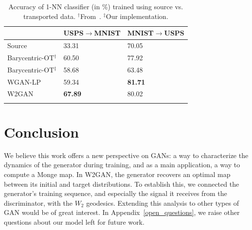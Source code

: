 \documentclass[runningheads]{llncs}
\begin{document}
\begin{table}[!t]
\centering
\begin{tabular}{ C{3cm}C{3cm}C{3cm} } 
 \toprule
  & USPS$\rightarrow$MNIST & MNIST$\rightarrow$USPS\\ 
 \midrule
 Source & 33.31 & 70.05\\ 
 Barycentric-OT$^\dagger$ & 60.50 & 77.92\\ 
 Barycentric-OT$^\ddagger$ & 58.68 & 63.48\\ 
 WGAN-LP &  59.34  & \textbf{81.71}\\ 
 W2GAN & \textbf{67.89} & 80.02\\ 
 \bottomrule \\
\end{tabular}
\caption{Accuracy of 1-NN classifier (in \%) trained using source vs. transported data. $^\dagger$From~\citep{Seguy2018LSOT}. $^\ddagger$Our implementation.}
    \label{tab:da_results}
\end{table}



\section{Conclusion}
We believe this work offers a new perspective on GANs: a way to characterize the dynamics of the generator during training, and as a main application, a way to compute a Monge map. In W2GAN, the generator recovers an optimal map between its initial and target distributions. To establish this, we connected the generator's training sequence, and especially the signal it receives from the discriminator, with the $W_2$ geodesics. Extending this analysis to other types of GAN would be of great interest. In Appendix~\ref{open_questions}, we raise other questions about our model left for future work.

\end{document}
